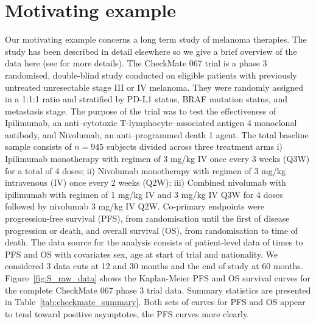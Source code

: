 \documentclass[AMA,STIX1COL]{WileyNJD-v2}
\begin{document}
\section{Motivating example}\label{sec:example}
Our motivating example concerns a long term study of melanoma therapies.
The study has been described in detail elsewhere so we give a brief overview of the data here (see \citep{Wolchok2017, Larkin2019} for more details).
The CheckMate 067 trial is a phase 3 randomised, double-blind study conducted on eligible patients with previously untreated unresectable stage III or IV melanoma.
They were randomly assigned in a 1:1:1 ratio and stratified by PD-L1 status, BRAF mutation status, and metastasis stage.
The purpose of the trial was to test the effectiveness of Ipilimumab, an anti–cytotoxic T-lymphocyte–associated antigen 4 monoclonal antibody, and Nivolumab, an anti–programmed death 1 agent.
The total baseline sample consists of $n = 945$ subjects divided across three treatment arms
i) Ipilimumab monotherapy with regimen of 3 mg/kg IV once every 3 weeks (Q3W) for a total of 4 doses;
ii) Nivolumab monotherapy with regimen of 3 mg/kg intravenous (IV) once every 2 weeks (Q2W);
iii) Combined nivolumab with ipilimumab with regimen of 1 mg/kg IV and 3 mg/kg IV Q3W for 4 doses followed by nivolumab 3 mg/kg IV Q2W.
Co-primary endpoints were progression-free survival (PFS), from randomisation until the first of disease progression or death, and overall survival (OS), from randomisation to time of death.
The data source for the analysis consists of patient-level data of times to PFS and OS with covariates sex, age at start of trial and nationality.
We considered 3 data cuts at 12 and 30 months and the end of study at 60 months.
Figure~\ref{fig:S_raw_data} shows the Kaplan-Meier PFS and OS survival curves for the complete CheckMate 067 phase 3 trial data.
Summary statistics are presented in Table~\ref{tab:checkmate_summary}.
Both sets of curves for PFS and OS appear to tend toward positive asymptotes, the PFS curves more clearly.
\end{document}
